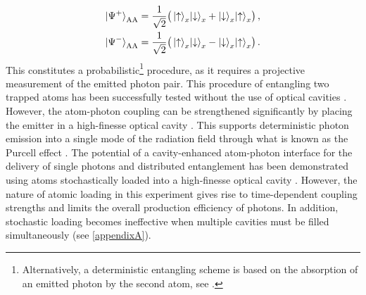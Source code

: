 \documentclass[../Thesis-IJspeert.tex]{subfiles}
\begin{document}
\begin{equation}
\begin{split}
\color{black} \ket{\Psi^+}_\text{AA} = \frac{1}{\sqrt{2}} \big( \ket{\uparrow}_x\!\ket{\downarrow}_x + \ket{\downarrow}_x\!\ket{\uparrow}_x \! \big) \,, \\ \color{black} \ket{\Psi^-}_\text{AA} = \frac{1}{\sqrt{2}} \big( \ket{\uparrow}_x\!\ket{\downarrow}_x - \ket{\downarrow}_x\!\ket{\uparrow}_x \! \big) \,.
\end{split}
\end{equation}
This constitutes a probabilistic\footnote{Alternatively, a deterministic entangling scheme is based on the absorption of an emitted photon by the second atom, see \cite{Dilley2012}.} procedure, as it requires a projective measurement of the emitted photon pair. This procedure of entangling two trapped  atoms has been successfully tested without the use of optical cavities \cite{Hofmann2012}. However, the atom-photon coupling can be strengthened significantly by placing the emitter in a high-finesse optical cavity \cite{Specht2011,Hijlkema2007}. This supports deterministic photon emission into a single mode of the radiation field through what is known as the Purcell effect \cite{Purcell1946}. The potential of a cavity-enhanced atom-photon interface for the delivery of single photons and distributed entanglement has been demonstrated using  atoms stochastically loaded into a high-finesse optical cavity \cite{Barrett2019}. However, the nature of atomic loading in this experiment gives rise to time-dependent coupling strengths and limits the overall production efficiency of photons. In addition, stochastic loading becomes ineffective when multiple cavities must be filled simultaneously (see \autoref{appendixA}).

	
\end{document}
